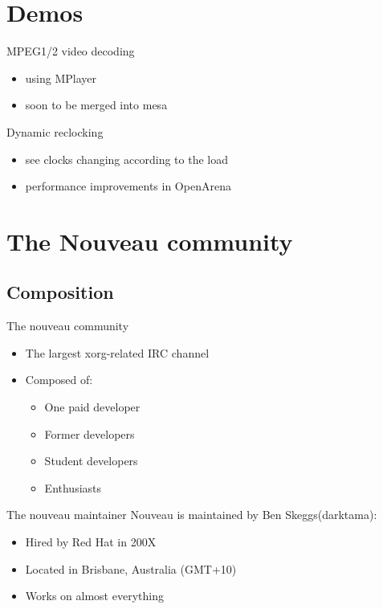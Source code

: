 \documentclass[11pt,english,compress]{beamer}
\begin{document}
\section{Demos}
	\begin{frame}
		\begin{block}{MPEG1/2 video decoding}
			\begin{itemize}
				\item using MPlayer
				\item soon to be merged into mesa
			\end{itemize}
		\end{block}
	\end{frame}

	\begin{frame}
		\begin{block}{Dynamic reclocking}
			\begin{itemize}
				\item see clocks changing according to the load
				\item performance improvements in OpenArena
			\end{itemize}
		\end{block}
	\end{frame}

\section{The Nouveau community}
	\subsection{Composition}
		\begin{frame}
			\begin{block}{The nouveau community}
				\begin{itemize}
					\item The largest xorg-related IRC channel
					\item Composed of:
						\begin{itemize}
							\item One paid developer
							\item Former developers
							\item Student developers
							\item Enthusiasts
						\end{itemize}
				\end{itemize}
			\end{block}

			\begin{block}{The nouveau maintainer}
				Nouveau is maintained by Ben Skeggs(darktama):
				\begin{itemize}
					\item Hired by Red Hat in 200X
					\item Located in Brisbane, Australia (GMT+10)
					\item Works on almost everything
				\end{itemize}
			\end{block}
		\end{frame}
\end{document}
